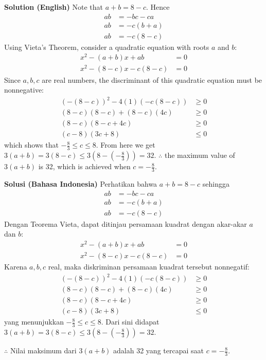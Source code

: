 
\begin{solusi}
\textbf{Solution (English)}
Note that $a+b = 8-c$. Hence
\begin{align*}
    ab &= -bc-ca\\
    ab &= -c(b+a)\\
    ab &= -c(8-c)
\end{align*}
Using Vieta's Theorem, consider a quadratic equation with roots $a$ and $b$:
\begin{align*}
    x^2 - (a+b)x + ab &= 0\\
    x^2 - (8-c)x - c(8-c) &= 0
\end{align*}
Since $a,b,c$ are real numbers, the discriminant of this quadratic equation must be nonnegative:
\begin{align*}
    (-(8-c))^2 - 4(1)(-c(8-c)) &\ge 0\\
    (8-c)(8-c) + (8-c)(4c) &\ge 0\\
    (8-c)(8-c+4c) &\ge 0\\
    (c-8)(3c+8) &\le 0
\end{align*}
which shows that $-\frac{8}{3} \le c \le 8$.
From here we get $3(a+b) = 3(8-c) \le 3(8-(-\frac{8}{3})) = 32$.
$\therefore$ the maximum value of $3(a + b)$ is 32, which is achieved when $c=-\frac{8}{3}$.

\textbf{Solusi (Bahasa Indonesia)}
Perhatikan bahwa $a+b = 8-c$ sehingga
\begin{align*}
    ab &= -bc-ca\\
    ab &= -c(b+a)\\
    ab &= -c(8-c)
\end{align*}
Dengan Teorema Vieta, dapat ditinjau persamaan kuadrat dengan akar-akar $a$ dan $b$:
\begin{align*}
    x^2 - (a+b)x + ab &= 0\\
    x^2 - (8-c)x - c(8-c) &= 0
\end{align*}
Karena $a,b,c$ real, maka diskriminan persamaan kuadrat tersebut nonnegatif:
\begin{align*}
    (-(8-c))^2 - 4(1)(-c(8-c)) &\ge 0\\
    (8-c)(8-c) + (8-c)(4c) &\ge 0\\
    (8-c)(8-c+4c) &\ge 0\\
    (c-8)(3c+8) &\le 0
\end{align*}
yang menunjukkan $-\frac{8}{3} \le c \le 8$.
Dari sini didapat $3(a+b) = 3(8-c) \le 3(8-(-\frac{8}{3})) = 32$.

$\therefore$ Nilai maksimum dari $3(a + b)$ adalah 32 yang tercapai saat $c=-\frac{8}{3}$.
\end{solusi}